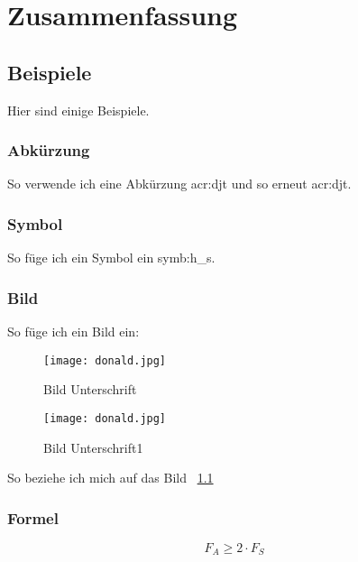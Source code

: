 
\chapter{Zusammenfassung}
\label{sec:conclusion_future-work}

\section{Beispiele}
\label{sec:Bsp}


Hier sind einige Beispiele.

\subsection{Abkürzung}
\label{subsec:abkürzung}

So verwende ich eine Abkürzung \gls{acr:djt} und so erneut \gls{acr:djt}.


\subsection{Symbol}
\label{subsec:symbol}
So füge ich ein Symbol ein \gls{symb:h_s}.


\subsection{Bild}
\label{subsec:Bild}
So füge ich ein Bild ein:

\begin{figure}[H]
	\centering
	\texttt{[image: donald.jpg]}
	\caption[Titel für das Abbildungsverzeichnis]{Bild Unterschrift} \cite{wangVisibleLightCommunications2017}
	\label{fig:donald}
\end{figure}


\begin{figure}[H]
	\centering
	\texttt{[image: donald.jpg]}
	\caption[Titel für das Abbildungsverzeichnis1]{Bild Unterschrift1 \cite{stinyAktiveElektronischeBauelemente2019}}
	\label{fig:donald1}
\end{figure}


So beziehe ich mich auf das Bild ~\ref{fig:donald}

\subsection{Formel}
\label{subsec:formel}

\begin{equation}
	\label{equ:bsp1}
	F_{A} \geq 2 \cdot F_{S}
\end{equation}

